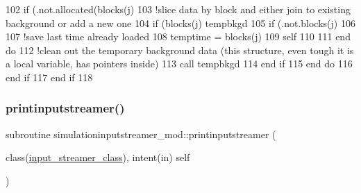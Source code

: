 \begin{DoxyCode}
102                         \textcolor{keywordflow}{if} (.not.\textcolor{keyword}{allocated}(blocks(j)%
103                         \textcolor{comment}{!slice data by block and either join to existing background or add a new one}
104                         \textcolor{keywordflow}{if} (blocks(j)%
      tempbkgd%
105                         \textcolor{keywordflow}{if} (.not.blocks(j)%
106 
107                         \textcolor{comment}{!save last time already loaded}
108                         temptime = blocks(j)%
109                         self%
110 
111 \textcolor{keywordflow}{                    end do}
112                     \textcolor{comment}{!clean out the temporary background data (this structure, even tough it is a local
       variable, has pointers inside)}
113                     \textcolor{keyword}{call }tempbkgd%
114 \textcolor{keywordflow}{                end if}
115 \textcolor{keywordflow}{            end do}
116 \textcolor{keywordflow}{        end if}
117 \textcolor{keywordflow}{    end if}
118 
\end{DoxyCode}
\mbox{\label{namespacesimulationinputstreamer__mod_a1b906bc5ba1fac8d846b30237216aca4}} 
\subsubsection{\texorpdfstring{printinputstreamer()}{printinputstreamer()}}
{\footnotesize\ttfamily subroutine simulationinputstreamer\+\_\+mod\+::printinputstreamer (\begin{DoxyParamCaption}\item[{class(\mbox{\hyperlink{structsimulationinputstreamer__mod_1_1input__streamer__class}{input\+\_\+streamer\+\_\+class}}), intent(in)}]{self }\end{DoxyParamCaption})\hspace{0.3cm}{\ttfamily [private]}}



